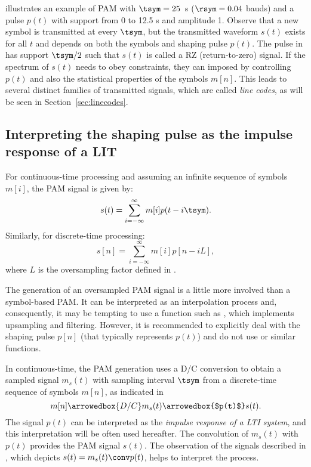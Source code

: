  illustrates an example of PAM with $\tsym=25$~s ($\rsym=0.04$ bauds) and a pulse $p(t)$ with support from 0 to 12.5 s and amplitude 1. Observe that a new symbol is transmitted at every $\tsym$, but the transmitted waveform $s(t)$ exists for all $t$ and depends on both the symbols and shaping pulse $p(t)$. The pulse in  has support $\tsym/2$ such that $s(t)$ is called a RZ (return-to-zero) signal. If the spectrum of $s(t)$ needs to obey constraints, they can imposed by controlling $p(t)$ and also the statistical properties of the symbols $m[n]$. This leads to 
several distinct families of transmitted signals, which are called \emph{line codes}, as will be seen in Section~\ref{sec:linecodes}.


\subsection{Interpreting the shaping pulse as the impulse response of a LIT}

For continuous-time processing and assuming an infinite sequence of symbols $m[i]$, the PAM signal is given by:
\begin{equation}
s(t) = \sum_{i=-\infty}^{\infty} m[i] p(t-i \tsym).
\label{eq:pam}
\end{equation}
Similarly, for discrete-time processing:
\begin{equation}
s[n] = \sum_{i=-\infty}^{\infty} m[i] p[n- i L],
\label{eq:pam_discrete_time}
\end{equation}
where $L$ is the oversampling factor defined in .

The generation of an oversampled PAM signal is a little more involved than a symbol-based PAM. It can be interpreted as an interpolation process and, consequently, it may be tempting to use a function such as , which implements upsampling and filtering. However, it is recommended to explicitly deal with the shaping pulse $p[n]$ (that typically represents $p(t)$) and do not use  or similar functions.

In continuous-time, the PAM generation uses a D/C conversion to obtain a sampled signal $m_s(t)$ with sampling interval $\tsym$ from a discrete-time sequence of symbols $m[n]$, as indicated in
\begin{equation}
m[n] \arrowedbox{ D/C } m_s(t) \arrowedbox{$p(t)$} s(t).
\label{eq:linecodegeneration}
\end{equation}
The signal $p(t)$ can be interpreted as the \emph{impulse response of a LTI system}, and this interpretation will be often used hereafter. The convolution of $m_s(t)$ with $p(t)$ provides the PAM signal $s(t)$. The observation of the signals described in , which depicts $s(t) =  m_s(t) \conv p(t)$, helps to interpret the process.

